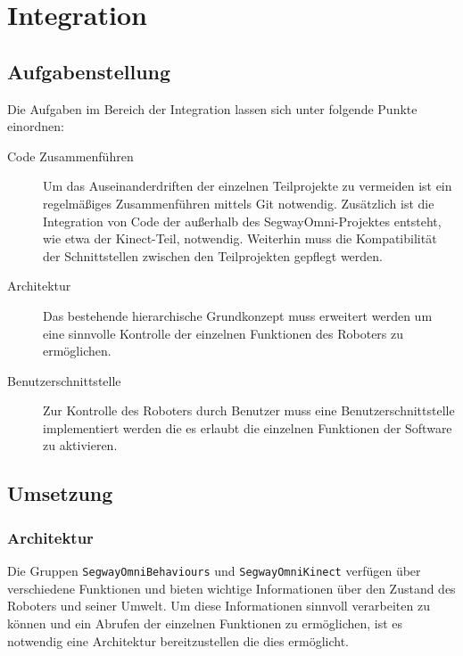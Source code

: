 
\chapter{Integration}
\label{integration_cha}
\authorsection{\editorjulian}

\section{Aufgabenstellung}
\label{aufgabenstellung_integration_sec}

Die Aufgaben im Bereich der Integration lassen sich unter folgende Punkte einordnen:

\begin{description}
\item[Code Zusammenführen]
Um das Auseinanderdriften der einzelnen Teilprojekte zu vermeiden ist ein regelmäßiges Zusammenführen 
mittels Git notwendig. Zusätzlich ist die Integration von Code der außerhalb des SegwayOmni-Projektes 
entsteht, wie etwa der Kinect-Teil, notwendig. Weiterhin muss die Kompatibilität der Schnittstellen 
zwischen den Teilprojekten gepflegt werden.

\item[Architektur]
Das bestehende hierarchische Grundkonzept muss erweitert werden um eine sinnvolle Kontrolle der 
einzelnen Funktionen des Roboters zu ermöglichen.

\item[Benutzerschnittstelle]
Zur Kontrolle des Roboters durch Benutzer muss eine Benutzerschnittstelle implementiert werden die es 
erlaubt die einzelnen Funktionen der Software zu aktivieren.

\end{description}

\section{Umsetzung}
\label{umsetzung_integration_sec}

\subsection{Architektur}
\label{integration_architektur_sec}

Die Gruppen \lstinline{SegwayOmniBehaviours} und \lstinline{SegwayOmniKinect} verfügen über 
verschiedene Funktionen und bieten wichtige Informationen über den Zustand des Roboters und 
seiner Umwelt. Um diese Informationen sinnvoll verarbeiten zu können und ein Abrufen der einzelnen 
Funktionen zu ermöglichen, ist es notwendig eine Architektur bereitzustellen die dies ermöglicht.

